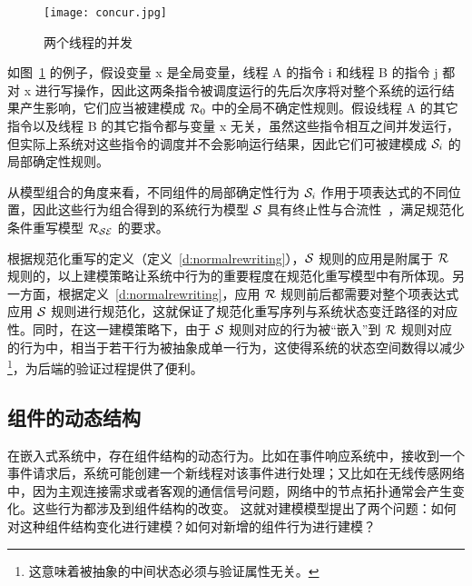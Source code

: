 \begin{figure}[ht]
\centering
\texttt{[image: concur.jpg]}
\caption{两个线程的并发}
\label{f:concur}
\end{figure}

如图~\ref{f:concur} 的例子，假设变量 x 是全局变量，线程 A 的指令 i 和线程 B 的指令 j 都对 x 进行写操作，因此这两条指令被调度运行的先后次序将对整个系统的运行结果产生影响，它们应当被建模成 $\mathcal{R}_0$ 中的全局不确定性规则。假设线程 A 的其它指令以及线程 B 的其它指令都与变量 x 无关，虽然这些指令相互之间并发运行，但实际上系统对这些指令的调度并不会影响运行结果，因此它们可被建模成 $\mathcal{S}_i$ 的局部确定性规则。

从模型组合的角度来看，不同组件的局部确定性行为 $\mathcal{S}_i$ 作用于项表达式的不同位置，因此这些行为组合得到的系统行为模型 $\mathcal{S}$ 具有终止性与合流性~\cite{DBLP:journals/jacm/Huet80}，满足规范化条件重写模型 $\mathcal{R}_{\mathcal{S}\mathcal{E}}$ 的要求。

根据规范化重写的定义（定义~\ref{d:normalrewriting}），$\mathcal{S}$ 规则的应用是附属于 $\mathcal{R}$ 规则的，以上建模策略让系统中行为的重要程度在规范化重写模型中有所体现。另一方面，根据定义~\ref{d:normalrewriting}，应用 $\mathcal{R}$ 规则前后都需要对整个项表达式应用 $\mathcal{S}$ 规则进行规范化，这就保证了规范化重写序列与系统状态变迁路径的对应性。同时，在这一建模策略下，由于 $\mathcal{S}$ 规则对应的行为被“嵌入”到 $\mathcal{R}$ 规则对应的行为中，相当于若干行为被抽象成单一行为，这使得系统的状态空间数得以减少\footnote{这意味着被抽象的中间状态必须与验证属性无关。}，为后端的验证过程提供了便利。


\subsection{组件的动态结构}
\label{ss:dynamic-component}

在嵌入式系统中，存在组件结构的动态行为。比如在事件响应系统中，接收到一个事件请求后，系统可能创建一个新线程对该事件进行处理；又比如在无线传感网络中，因为主观连接需求或者客观的通信信号问题，网络中的节点拓扑通常会产生变化。这些行为都涉及到组件结构的改变。
这就对建模模型提出了两个问题：如何对这种组件结构变化进行建模？如何对新增的组件行为进行建模？

